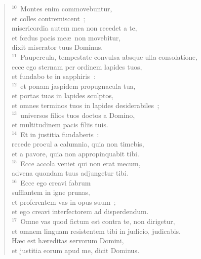 \begin{verse}
${}^{10}$~Montes enim commovebuntur,\\ et colles contremiscent~;\\ misericordia autem mea non recedet a te,\\ et fœdus pacis me\ae\ non movebitur,\\ dixit miserator tuus Dominus.\\
${}^{11}$~Paupercula, tempestate convulsa absque ulla consolatione,\\ ecce ego sternam per ordinem lapides tuos,\\ et fundabo te in sapphiris~:\\
${}^{12}$~et ponam jaspidem propugnacula tua,\\ et portas tuas in lapides sculptos,\\ et omnes terminos tuos in lapides desiderabiles~;\\
${}^{13}$~universos filios tuos doctos a Domino,\\ et multitudinem pacis filiis tuis.\\
${}^{14}$~Et in justitia fundaberis~:\\ recede procul a calumnia, quia non timebis,\\ et a pavore, quia non appropinquabit tibi.\\
${}^{15}$~Ecce accola veniet qui non erat mecum,\\ advena quondam tuus adjungetur tibi.\\
${}^{16}$~Ecce ego creavi fabrum\\ sufflantem in igne prunas,\\ et proferentem vas in opus suum~;\\ et ego creavi interfectorem ad disperdendum.\\
${}^{17}$~Omne vas quod fictum est contra te, non dirigetur,\\ et omnem linguam resistentem tibi in judicio, judicabis.\\ H\ae c est h\ae reditas servorum Domini,\\ et justitia eorum apud me, dicit Dominus.\end{verse}


